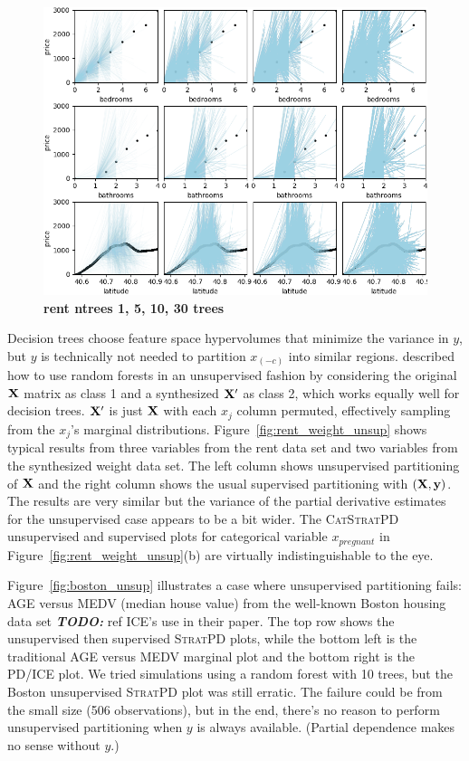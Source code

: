 \documentclass[12pt]{article}
\newcommand{\figref}[1]{Figure~\ref{#1}}
\newcommand{\todo}[1]{{\bf\em TODO:} {{#1}}}
\newcommand{\spd}{\fontfamily{cmr}\textsc{\small StratPD}}
\newcommand{\cspd}{\fontfamily{cmr}\textsc{\small CatStratPD}}
\newcommand{\xnc}{$x_{(-c)}$}
\begin{document}
\begin{figure}[htbp]
\begin{center}
\includegraphics[scale=0.5]{images/rent_ntrees.png}
\caption{{\bf  rent ntrees 1, 5, 10, 30 trees}}
\label{fig:rent_ntrees}
\end{center}
\end{figure}

Decision trees choose feature space hypervolumes that minimize the variance in $y$, but $y$ is technically not needed to partition \xnc{} into similar regions. \cite{RFunsup} described how to use random forests in an unsupervised fashion by considering the original $\bf X$ matrix as class 1 and a synthesized $\bf X'$ as class 2, which works equally well for decision trees. $\bf X'$ is just $\bf X$ with each $x_j$ column permuted, effectively sampling from the $x_j$'s marginal distributions. \figref{fig:rent_weight_unsup} shows typical results from three variables from the rent data set and two variables from the synthesized weight data set.  The left column shows unsupervised partitioning of $\bf X$ and the right column shows the usual supervised partitioning with $(\bf X, y)$. The results are very similar but the variance of the partial derivative estimates for the unsupervised case appears to be a bit wider. The \cspd{} unsupervised and supervised plots for categorical variable $x_{pregnant}$ in \figref{fig:rent_weight_unsup}(b) are virtually indistinguishable to the eye. 

\figref{fig:boston_unsup} illustrates a case where unsupervised partitioning fails: AGE versus MEDV (median house value) from the well-known Boston housing data set \todo{ref ICE's use in their paper}. The top row shows the unsupervised then supervised \spd{} plots, while the bottom left is the traditional AGE versus MEDV marginal plot and the bottom right is the PD/ICE plot. We tried simulations using a random forest with 10 trees, but the Boston unsupervised \spd{} plot was still erratic. The failure could be from the small size (506 observations), but in the end, there's no reason to perform unsupervised partitioning when $y$ is always available. (Partial dependence makes no sense without $y$.) 
\end{document}
